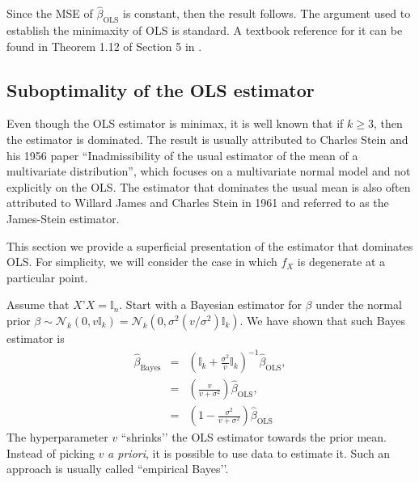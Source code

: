 \documentclass[11pt]{article} %
\begin{document}
\noindent Since the MSE of $\widehat{\beta}_{\textrm{OLS}}$ is constant, then the result follows. The argument used to establish the minimaxity of OLS is standard. A textbook reference for it can be found in Theorem 1.12 of Section 5 in  \cite{lehmann1998theory}.





\subsection{Suboptimality of the OLS estimator}

Even though the OLS estimator is minimax, it is well known that if $k \geq 3$, then the estimator is dominated. The result is usually attributed to Charles Stein and his 1956 paper ``Inadmissibility of the usual estimator of the mean of a multivariate distribution'', which focuses on a multivariate normal model and not explicitly on the OLS. The estimator that dominates the usual mean is also often attributed to Willard James and Charles Stein in 1961 and referred to as the James-Stein estimator. 


This section we provide a superficial presentation of the estimator that dominates OLS. For simplicity, we will consider the case in which $f_{X}$ is degenerate at a particular point. 

Assume that $X’X = \mathbb{I}_n$. Start with a Bayesian estimator for $\beta$ under the normal prior $\beta \sim \mathcal{N}_{k}(0,  v \mathbb{I}_k ) = \mathcal{N}_{k}(0,  \sigma^2 (v/\sigma^2) \mathbb{I}_k ) $. We have shown that such Bayes estimator is
\begin{eqnarray*}
\widehat{\beta}_{\textrm{Bayes}} &=& \left(  \mathbb{I}_k + \frac{\sigma^2}{v} \mathbb{I}_k  \right)^{-1} \widehat{\beta} _{\textrm{OLS}}, \\ 
&=& \left( \frac{v}{v+\sigma^2} \right) \widehat{\beta}_{\textrm{OLS}}, \\
&=& \left(1 -  \frac{\sigma^2}{v+\sigma^2} \right) \widehat{\beta}_{\textrm{OLS}}
\end{eqnarray*}
The hyperparameter $v$ ``shrinks’’ the OLS estimator towards the prior mean. Instead of picking $v$ \emph{a priori}, it is possible to use data to estimate it. Such an approach is usually called ``empirical Bayes’’. 
\end{document}

